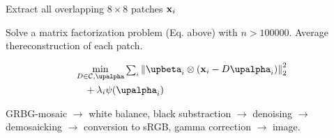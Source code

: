 \begin{compactdesc}
\begin{align*}
	\end{align*}
\item[\lp{solve denoising problem}] \hfill\\
	\begin{enumerate*}[label=\protect\circled{\arabic*},itemjoin=]
		\item Extract all overlapping $8\times 8$ patches $\bm{\mathrm{x}}_i$\\
		\item Solve a matrix factorization problem (Eq. above) with $n>100000$. Average thereconstruction of each patch.
	\end{enumerate*}
\item[\lp{Inpainting, Demosaicking}] 
	\begin{align*}
		&\min_{D\in \mathcal{C},\vtr{\upalpha}}{\scriptstyle\sum_{i}^{}}\norm{\vtr{\upbeta}_i\otimes\left( \vtr{x}_i-D\vtr{\upalpha}_i \right)}_{2}^{2}\\
		&\quad+\lambda_i\psi(\upalpha_i)
	\end{align*}
\item[\lp{RAW Image Processing}] GRBG-mosaic $\to$ white balance, black substraction $\to$ denoising $\to$ demosaicking $\to$ conversion to sRGB, gamma correction $\to$ image.
\end{compactdesc}

